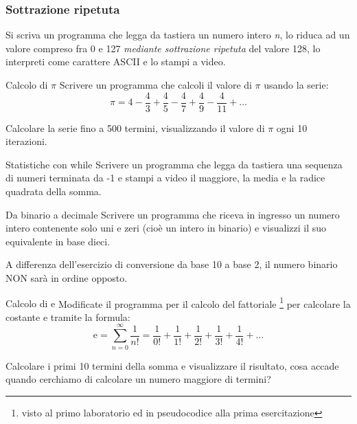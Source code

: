 \documentclass[format=169]{beamer}
\begin{document}
\begin{frame}
\frametitle{Sottrazione ripetuta}
Si scriva un programma che legga da tastiera un numero intero \emph{n}, lo riduca ad un valore compreso fra 0 e 127 \emph{mediante sottrazione ripetuta} del valore 128, lo interpreti come carattere ASCII e lo stampi a video.
\end{frame}

\begin{frame}{Calcolo di $\pi$}
Scrivere un programma che calcoli il valore di $\pi$ usando la serie:
\[ \pi = 4 - \frac{4}{3} + \frac{4}{5} - \frac{4}{7} + \frac{4}{9} - \frac{4}{11} + \dots \]

Calcolare la serie fino a 500 termini, visualizzando il valore di $\pi$ ogni 10 iterazioni.
\end{frame}

\begin{frame}{Statistiche con while}
Scrivere un programma che legga da tastiera una sequenza di numeri terminata da -1 e stampi a video il maggiore, la media e la radice quadrata della somma.
\end{frame}

\begin{frame}{Da binario a decimale}
	Scrivere un programma che riceva in ingresso un numero intero contenente solo uni e zeri (cioè un intero in
	binario) e visualizzi il suo equivalente in base dieci.

	A differenza dell'esercizio di conversione da base 10 a base 2, il numero binario NON sarà in ordine opposto.
\end{frame}

\begin{frame}{Calcolo di $\mathrm{e}$}
	Modificate il programma per il calcolo del fattoriale \footnote{visto al primo laboratorio ed in pseudocodice alla prima esercitazione} per calcolare la costante $\mathrm{e}$ tramite la formula:
	\[ \mathrm{e} = \sum_{n=0}^{\infty} \frac{1}{n!} = \frac{1}{0!} + \frac{1}{1!} + \frac{1}{2!} + \frac{1}{3!} +
	\frac{1}{4!} + \dots \]

	Calcolare i primi 10 termini della somma e visualizzare il risultato, cosa accade quando cerchiamo di calcolare
	un numero maggiore di termini?
\end{frame}
\end{document}
